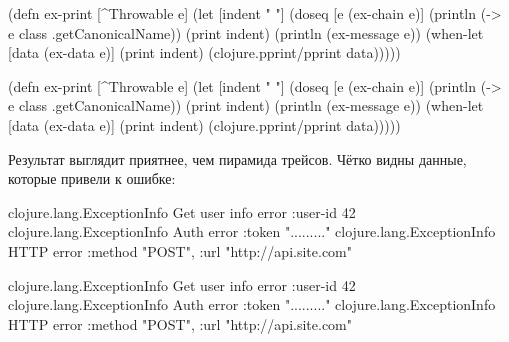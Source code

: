 \ifx\devicetype\mobile

\begin{english}
  \begin{clojure}
(defn ex-print
  [^Throwable e]
  (let [indent "  "]
    (doseq [e (ex-chain e)]
      (println (-> e
                   class
                   .getCanonicalName))
      (print indent)
      (println (ex-message e))
      (when-let [data (ex-data e)]
        (print indent)
        (clojure.pprint/pprint data)))))
  \end{clojure}
\end{english}

\else

\begin{english}
  \begin{clojure}
(defn ex-print
  [^Throwable e]
  (let [indent "  "]
    (doseq [e (ex-chain e)]
      (println (-> e class .getCanonicalName))
      (print indent)
      (println (ex-message e))
      (when-let [data (ex-data e)]
        (print indent)
        (clojure.pprint/pprint data)))))
  \end{clojure}
\end{english}

\fi

Результат выглядит приятнее, чем пирамида трейсов. Чётко видны данные,
которые привели к ошибке:

\ifx\devicetype\mobile

\begin{english}
  \begin{clojure}
clojure.lang.ExceptionInfo
  Get user info error
  {:user-id 42}
clojure.lang.ExceptionInfo
  Auth error
  {:token "........."}
clojure.lang.ExceptionInfo
  HTTP error
  {:method "POST",
   :url "http://api.site.com"}
  \end{clojure}
\end{english}

\else

\begin{english}
  \begin{clojure}
clojure.lang.ExceptionInfo
  Get user info error
  {:user-id 42}
clojure.lang.ExceptionInfo
  Auth error
  {:token "........."}
clojure.lang.ExceptionInfo
  HTTP error
  {:method "POST", :url "http://api.site.com"}
  \end{clojure}
\end{english}

\fi


